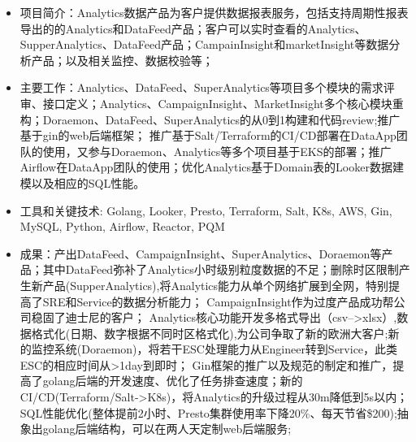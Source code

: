 \documentclass{resume}
\begin{document}
\begin{itemize}
  \item 项目简介：Analytics数据产品为客户提供数据报表服务，包括支持周期性报表导出的的Analytics和DataFeed产品；客户可以实时查看的Analytics、SupperAnalytics、DataFeed产品；CampainInsight和marketInsight等数据分析产品；以及相关监控、数据校验等；
  \item 主要工作：Analytics、DataFeed、SuperAnalytics等项目多个模块的需求评审、接口定义；Analytics、CampaignInsight、MarketInsight多个核心模块重构；Doraemon、DataFeed、SuperAnalytics的从0到1构建和代码review;推广基于gin的web后端框架；
  推广基于Salt/Terraform的CI/CD部署在DataApp团队的使用，又参与Doraemon、Analytics等多个项目基于EKS的部署；推广Airflow在DataApp团队的使用；优化Analytics基于Domain表的Looker数据建模以及相应的SQL性能。
  \item 工具和关键技术: Golang, Looker, Presto, Terraform, Salt, K8s, AWS, Gin, MySQL, Python, Airflow, Reactor, PQM
  \item 成果：产出DataFeed、CampaignInsight、SuperAnalytics、Doraemon等产品；其中DataFeed弥补了Analytics小时级别粒度数据的不足；删除时区限制产生新产品(SupperAnalytics),将Analytics能力从单个网络扩展到全网，特别提高了SRE和Service的数据分析能力；
  CampaignInsight作为过度产品成功帮公司稳固了迪士尼的客户；
  Analytics核心功能开发多格式导出（csv-->xlsx）,数据格式化(日期、数字根据不同时区格式化),为公司争取了新的欧洲大客户;新的监控系统(Doraemon)，将若干ESC处理能力从Engineer转到Service，此类ESC的相应时间从>1day到即时；
  Gin框架的推广以及规范的制定和推广，提高了golang后端的开发速度、优化了任务排查速度；新的CI/CD(Terraform/Salt->K8s)，将Analytics的升级过程从30m降低到5s以内；SQL性能优化(整体提前2小时、Presto集群使用率下降20\%、每天节省\$200);抽象出golang后端结构，可以在两人天定制web后端服务;
\end{itemize}
\end{document}
